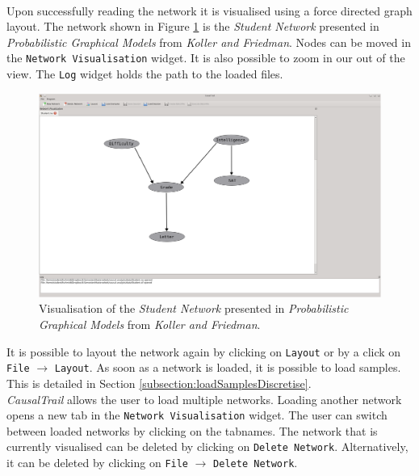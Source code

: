 \noindent
\\Upon successfully reading the network it is visualised using a force directed graph layout. The network shown in Figure \ref{figure:networkExample} is the \textit{Student Network}
presented in \textit{Probabilistic Graphical Models} from \textit{Koller and Friedman}.  Nodes can be moved in the \texttt{Network Visualisation} widget. It is also possible to
zoom in our out of the view. The \texttt{Log} widget holds the path to the loaded files.
\begin{figure}[H]
 \includegraphics[width=\textwidth]{pic/gui2.eps}
 \caption{Visualisation of the \textit{Student Network} presented in \textit{Probabilistic Graphical Models} from \textit{Koller and Friedman}.}
 \label{figure:networkExample}
\end{figure}
\noindent
It is possible to layout the network again by clicking on \texttt{Layout} or by a click on \texttt{File} $\rightarrow$ \texttt{Layout}.
As soon as a network is loaded, it is possible to load samples. This is detailed in Section \ref{subsection:loadSamplesDiscretise}.
\bigskip
\\\textit{CausalTrail} allows the user to load multiple networks. Loading another network opens a new tab in the \texttt{Network Visualisation} widget. The user can switch between
loaded networks by clicking on the tabnames. The network that is currently visualised can be deleted by clicking on \texttt{Delete Network}. Alternatively, it can be deleted
by clicking on \texttt{File} $\rightarrow$ \texttt{Delete Network}.

